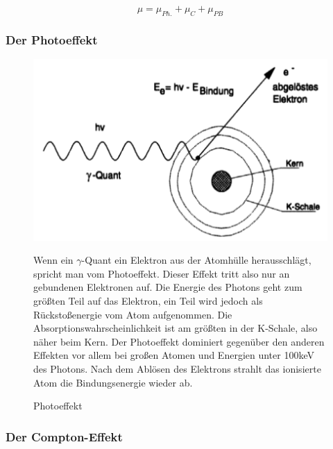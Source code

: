$$\mu = \mu_{Ph.} + \mu_{C} + \mu_{PB} $$

\subsubsection{Der Photoeffekt}

\begin{figure}[H]
	\begin{minipage}{0.6\textwidth}
	\centering \includegraphics[width=\textwidth]{Bilder/Photoeffekt.png}
	\caption{Photoeffekt}
	\end{minipage}
	\begin{minipage}{0.4\textwidth}
	Wenn ein $\gamma$-Quant ein Elektron aus der Atomhülle herausschlägt, spricht man vom Photoeffekt. 	Dieser Effekt tritt also nur an gebundenen Elek\-tro\-nen auf. Die Energie des Photons geht zum größten Teil 	auf das Elektron, ein Teil wird jedoch als Rückstoßenergie vom Atom aufgenommen. Die 				Ab\-sorp\-tions\-wahrscheinlichkeit ist am größten in der K-Schale, also näher beim Kern. Der Photoeffekt 	dominiert gegenüber den anderen Effekten vor allem bei großen Atomen und Energien unter 100keV des	Photons. Nach dem Ablösen des Elektrons strahlt das ionisierte Atom die Bindungsenergie wieder ab.
	\end{minipage}
\end{figure}

\subsubsection{Der Compton-Effekt}

